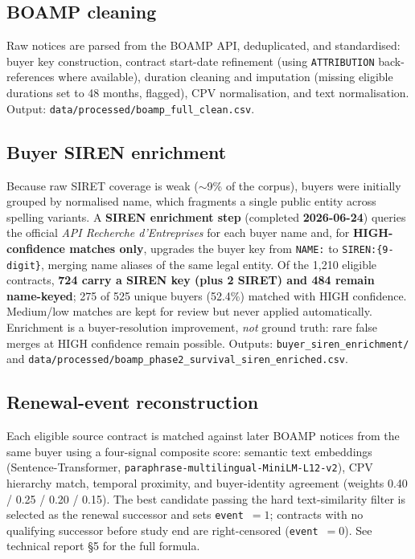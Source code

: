 \documentclass[11pt,a4paper]{article}
\begin{document}
\subsection{BOAMP cleaning}
Raw notices are parsed from the BOAMP API, deduplicated, and standardised:
buyer key construction, contract start-date refinement (using
\texttt{ATTRIBUTION} back-references where available), duration cleaning and
imputation (missing eligible durations set to 48 months, flagged), CPV
normalisation, and text normalisation. Output:
\nolinkurl{data/processed/boamp_full_clean.csv}.

\subsection{Buyer SIREN enrichment}
\label{sec:siren}
Because raw SIRET coverage is weak ($\sim$9\% of the corpus), buyers were
initially grouped by normalised name, which fragments a single public entity
across spelling variants. A \textbf{SIREN enrichment step} (completed
\textbf{2026-06-24}) queries the official \emph{API Recherche d'Entreprises} for
each buyer name and, for \textbf{HIGH-confidence matches only}, upgrades the
buyer key from \texttt{NAME:} to \texttt{SIREN:\{9-digit\}}, merging name aliases
of the same legal entity. Of the 1{,}210 eligible contracts, \textbf{724 carry a
SIREN key (plus 2 SIRET) and 484 remain name-keyed}; 275 of 525 unique buyers (52.4\%) matched
with HIGH confidence. Medium/low matches are kept for review but never applied
automatically. Enrichment is a buyer-resolution improvement, \emph{not} ground
truth: rare false merges at HIGH confidence remain possible. Outputs:
\nolinkurl{buyer_siren_enrichment/} and
\nolinkurl{data/processed/boamp_phase2_survival_siren_enriched.csv}.

\subsection{Renewal-event reconstruction}
\label{sec:linking}
Each eligible source contract is matched against later BOAMP notices from the
same buyer using a four-signal composite score: semantic text embeddings
(Sentence-Transformer, \nolinkurl{paraphrase-multilingual-MiniLM-L12-v2}), CPV
hierarchy match, temporal proximity, and buyer-identity agreement (weights
0.40 / 0.25 / 0.20 / 0.15). The best candidate passing the hard text-similarity
filter is selected as the renewal successor and sets \texttt{event}~$=1$;
contracts with no qualifying successor before study end are right-censored
(\texttt{event}~$=0$). See technical report \S5 for the full formula.
\end{document}
